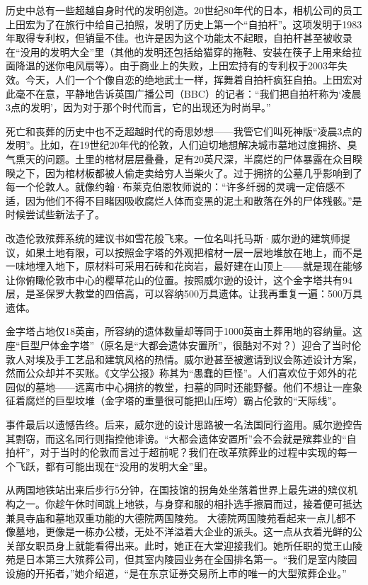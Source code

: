 \documentclass[12pt,oneside]{book}
\begin{document}
\begin{bookref}[frametitle={\cite{好好告别}}]
历史中总有一些超越自身时代的发明创造。20世纪80年代的日本，相机公司的员工上田宏为了在旅行中给自己拍照，发明了历史上第一个“自拍杆”。这项发明于1983年取得专利权，但销量不佳。也许是因为这个功能太不起眼，自拍杆甚至被收录在“没用的发明大全”里（其他的发明还包括给猫穿的拖鞋、安装在筷子上用来给拉面降温的迷你电风扇等）。由于商业上的失败，上田宏持有的专利权于2003年失效。今天，人们一个个像自恋的绝地武士一样，挥舞着自拍杆疯狂自拍。上田宏对此毫不在意，平静地告诉英国广播公司（BBC）的记者：“我们把自拍杆称为‘凌晨3点的发明’，因为对于那个时代而言，它的出现还为时尚早。”

死亡和丧葬的历史中也不乏超越时代的奇思妙想——我管它们叫死神版“凌晨3点的发明”。比如，在19世纪20年代的伦敦，人们迫切地想解决城市墓地过度拥挤、臭气熏天的问题。土里的棺材层层叠叠，足有20英尺深，半腐烂的尸体暴露在众目睽睽之下，因为棺材板都被人偷走卖给穷人当柴火了。过于拥挤的公墓几乎影响到了每一个伦敦人。就像约翰·布莱克伯恩牧师说的：“许多纤弱的灵魂一定倍感不适，因为他们不得不目睹因吸收腐烂人体而变黑的泥土和散落在外的尸体残骸。”是时候尝试些新法子了。

改造伦敦殡葬系统的建议书如雪花般飞来。一位名叫托马斯·威尔逊的建筑师提议，如果土地有限，可以按照金字塔的外观把棺材一层一层地堆放在地上，而不是一味地埋入地下，原材料可采用石砖和花岗岩，最好建在山顶上——就是现在能够让你俯瞰伦敦市中心的樱草花山的位置。按照威尔逊的设计，这个金字塔共有94层，是圣保罗大教堂的四倍高，可以容纳500万具遗体。让我再重复一遍：500万具遗体。

金字塔占地仅18英亩，所容纳的遗体数量却等同于1000英亩土葬用地的容纳量。这座“巨型尸体金字塔”（原名是“大都会遗体安置所”，很酷对不对？）迎合了当时伦敦人对埃及手工艺品和建筑风格的热情。威尔逊甚至被邀请到议会陈述设计方案，然而公众却并不买账。《文学公报》称其为“愚蠢的巨怪”。人们喜欢位于郊外的花园似的墓地——远离市中心拥挤的教堂，扫墓的同时还能野餐。他们不想让一座象征着腐烂的巨型坟堆（金字塔的重量很可能把山压垮）霸占伦敦的“天际线”。

事件最后以遗憾告终。后来，威尔逊的设计思路被一名法国同行盗用。威尔逊控告其剽窃，而这名同行则指控他诽谤。“大都会遗体安置所”会不会就是殡葬业的“自拍杆”，对于当时的伦敦而言过于超前呢？我们在改革殡葬业的过程中实现的每一个飞跃，都有可能出现在“没用的发明大全”里。

从两国地铁站出来后步行5分钟，在国技馆的拐角处坐落着世界上最先进的殡仪机构之一。你趁午休时间跳上地铁，与身穿和服的相扑选手擦肩而过，接着便可抵达兼具寺庙和墓地双重功能的大德院两国陵苑。
大德院两国陵苑看起来一点儿都不像墓地，更像是一栋办公楼，无处不洋溢着大企业的派头。这一点从衣着光鲜的公关部女职员身上就能看得出来。此时，她正在大堂迎接我们。她所任职的觉王山陵苑是日本第三大殡葬公司，但其室内陵园业务在全国排名第一。“我们是室内陵园设施的开拓者，”她介绍道，“是在东京证券交易所上市的唯一的大型殡葬企业。”


\end{bookref}
\end{document}

